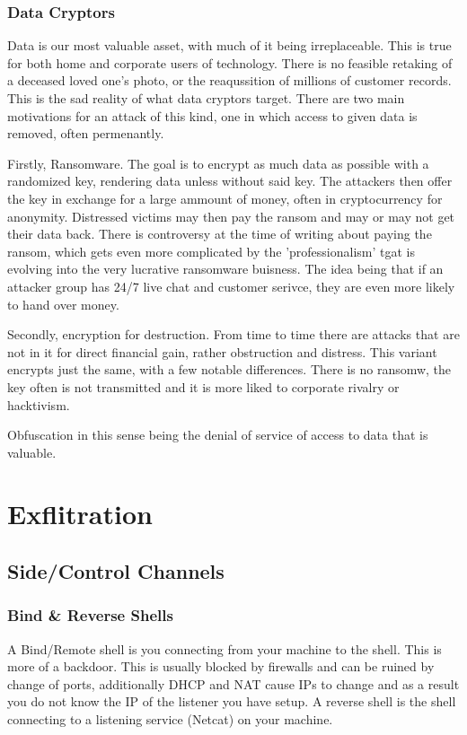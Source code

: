 \subsection{Data Cryptors}
Data is our most valuable asset, with much of it being irreplaceable. This is true for both home and corporate users of technology. There is no feasible retaking of a deceased loved one's photo, or the reaqussition of millions of customer records. This is the sad reality of what data cryptors target.
There are two main motivations for an attack of this kind, one in which access to given data is removed, often permenantly. 

Firstly, Ransomware. The goal is to encrypt as much data as possible with a randomized key, rendering data unless without said key. The attackers then offer the key in exchange for a large ammount of money, often in cryptocurrency for anonymity. Distressed victims may then pay the ransom and may or may not get their data back.
There is controversy at the time of writing about paying the ransom, which gets even more complicated by the 'professionalism' tgat is evolving into the very lucrative ransomware buisness. The idea being that if an attacker group has 24/7 live chat and customer serivce, they are even more likely to hand over money.

Secondly, encryption for destruction. From time to time there are attacks that are not in it for direct financial gain, rather obstruction and distress. This variant encrypts just the same, with a few notable differences. There is no ransomw, the key often is not transmitted and it is more liked to corporate rivalry or hacktivism.

Obfuscation in this sense being the denial of service of access to data that is valuable.





\chapter{Exflitration}
\section{Side/Control Channels}
\subsection{Bind & Reverse Shells}
A Bind/Remote shell is you connecting from your machine to the shell. This is more of a backdoor. This is usually blocked by firewalls and can be ruined by change of ports, additionally DHCP and NAT cause IPs to change and as a result you do not know the IP of the listener you have setup.
A reverse shell is the shell connecting to a listening service (Netcat) on your machine.

